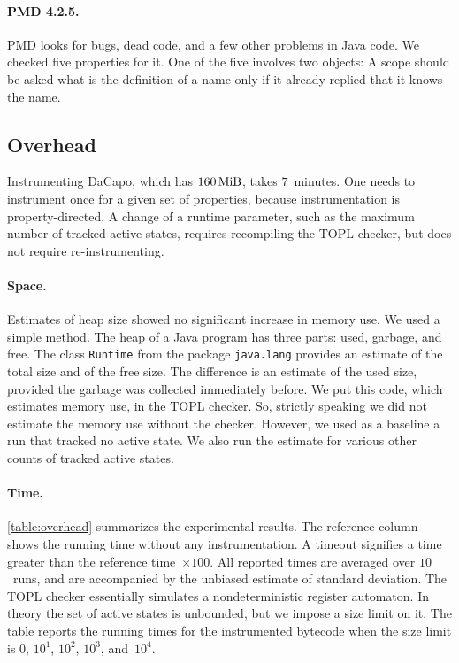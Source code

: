 \documentclass[10pt, preprint]{sigplanconf} %
\begin{document}
\paragraph{PMD 4.2.5.}
PMD looks for bugs, dead code, and a few other problems in Java code.
We checked five properties for it.
One of the five involves two objects:
A scope should be asked what is the definition of a name only if it already replied that it knows the name.

\subsection{Overhead} %

Instrumenting DaCapo, which has $160\rm\,MiB$, takes $7$~minutes.
One needs to instrument once for a given set of properties, because instrumentation is property-directed.
A change of a runtime parameter, such as the maximum number of tracked active states, requires recompiling the TOPL checker, but does not require re-instrumenting.

\paragraph{Space.}
Estimates of heap size showed no significant increase in memory use.
We used a simple method.
The heap of a Java program has three parts: used, garbage, and free.
The class {\tt Runtime} from the package {\tt java.lang} provides an estimate of the total size and of the free size.
The difference is an estimate of the used size, provided the garbage was collected immediately before.
We put this code, which estimates memory use, in the TOPL checker.
So, strictly speaking we did not estimate the memory use without the checker.
However, we used as a baseline a run that tracked no active state.
We also run the estimate for various other counts of tracked active states.

\paragraph{Time.}
\autoref{table:overhead} summarizes the experimental results.
The reference column shows the running time without any instrumentation.
A timeout signifies a time greater than the reference time~$\times100$.
All reported times are averaged over $10$~runs, and are accompanied by the unbiased estimate of standard deviation.
The TOPL checker essentially simulates a nondeterministic register automaton.
In theory the set of active states is unbounded, but we impose a size limit on it.
The table reports the running times for the instrumented bytecode when the size limit is $0$, $10^1$, $10^2$, $10^3$, and~$10^4$.
\end{document}
